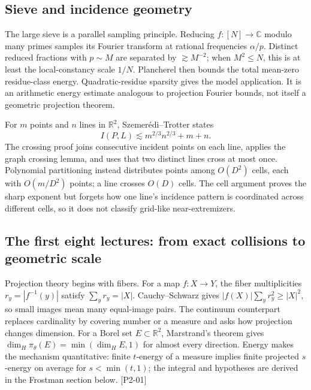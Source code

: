 \subsection{Sieve and incidence geometry}\label{04-visual-computing-ii-ch033-sieve-and-incidence-geometry}

The large sieve is a parallel sampling principle. Reducing \(f:[N]\to\mathbb C\) modulo many primes samples its Fourier transform at rational frequencies \(\alpha/p\). Distinct reduced fractions with \(p\sim M\) are separated by \(\gtrsim M^{-2}\); when \(M^2\le N\), this is at least the local-constancy scale \(1/N\). Plancherel then bounds the total mean-zero residue-class energy. Quadratic-residue sparsity gives the model application. It is an arithmetic energy estimate analogous to projection Fourier bounds, not itself a geometric projection theorem.

For \(m\) points and \(n\) lines in \(\mathbb R^2\), Szemerédi--Trotter states \[I(P,L)\lesssim m^{2/3}n^{2/3}+m+n.\] The crossing proof joins consecutive incident points on each line, applies the graph crossing lemma, and uses that two distinct lines cross at most once. Polynomial partitioning instead distributes points among \(O(D^2)\) cells, each with \(O(m/D^2)\) points; a line crosses \(O(D)\) cells. The cell argument proves the sharp exponent but forgets how one line's incidence pattern is coordinated across different cells, so it does not classify grid-like near-extremizers.

\subsection{The first eight lectures: from exact collisions to geometric scale}\label{04-visual-computing-ii-ch033-the-first-eight-lectures-from-exact-collisions-to-geometric-scale}

Projection theory begins with fibers. For a map \(f:X\to Y\), the fiber multiplicities \(r_y=|f^{-1}(y)|\) satisfy \(\sum_y r_y=|X|\). Cauchy--Schwarz gives \(|f(X)|\sum_y r_y^2\ge|X|^2\), so small images mean many equal-image pairs. The continuum counterpart replaces cardinality by covering number or a measure and asks how projection changes dimension. For a Borel set \(E\subset\mathbb R^2\), Marstrand's theorem gives \(\dim_H\pi_\theta(E)=\min(\dim_HE,1)\) for almost every direction. Energy makes the mechanism quantitative: finite \(t\)-energy of a measure implies finite projected \(s\)-energy on average for \(s<\min(t,1)\); the integral and hypotheses are derived in the Frostman section below. {[}P2-01{]}

